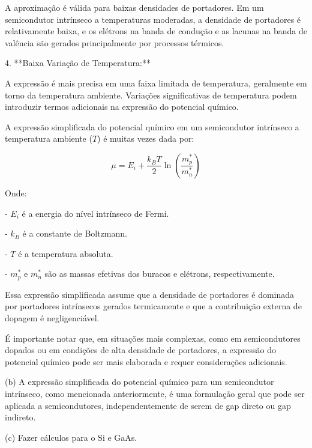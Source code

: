 \documentclass[a4paper,10pt]{article}
\begin{document}
   A aproximação é válida para baixas densidades de portadores. Em um semicondutor intrínseco a temperaturas moderadas, a densidade de portadores é relativamente baixa, e os elétrons na banda de condução e as lacunas na banda de valência são gerados principalmente por processos térmicos.

4. **Baixa Variação de Temperatura:**

   A expressão é mais precisa em uma faixa limitada de temperatura, geralmente em torno da temperatura ambiente. Variações significativas de temperatura podem introduzir termos adicionais na expressão do potencial químico.

A expressão simplificada do potencial químico em um semicondutor intrínseco a temperatura ambiente (\(T\)) é muitas vezes dada por:

\[ \mu = E_i + \frac{k_B T}{2} \ln\left(\frac{m_p^*}{m_n^*}\right) \]

Onde:

- \(E_i\) é a energia do nível intrínseco de Fermi.

- \(k_B\) é a constante de Boltzmann.

- \(T\) é a temperatura absoluta.

- \(m_p^*\) e \(m_n^*\) são as massas efetivas dos buracos e elétrons, respectivamente.

Essa expressão simplificada assume que a densidade de portadores é dominada por portadores intrínsecos gerados termicamente e que a contribuição externa de dopagem é negligenciável.

É importante notar que, em situações mais complexas, como em semicondutores dopados ou em condições de alta densidade de portadores, a expressão do potencial químico pode ser mais elaborada e requer considerações adicionais.

\n\n

(b) A expressão simplificada do potencial químico para um semicondutor intrínseco, como mencionada anteriormente, é uma formulação geral que pode ser aplicada a semicondutores, independentemente de serem de gap direto ou gap indireto.

\n\n

(c) Fazer cálculos para o Si e GaAs.
\end{document}
